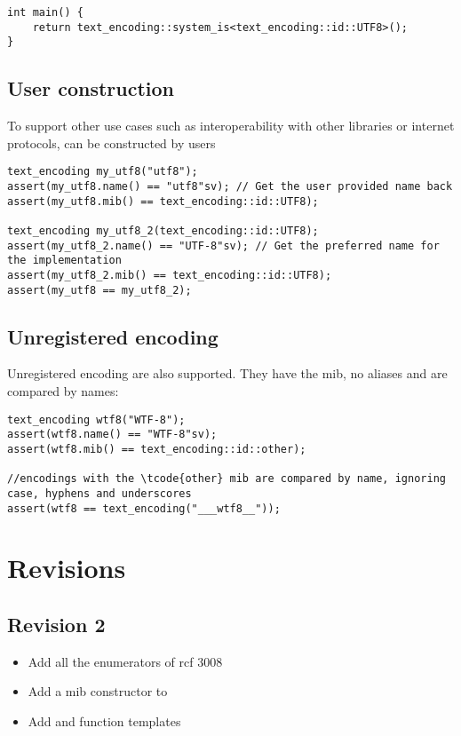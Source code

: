 \documentclass{wg21}
\begin{document}
\begin{lstlisting}[style=MY]
int main() {
    return text_encoding::system_is<text_encoding::id::UTF8>();
}
\end{lstlisting}




\subsection{User construction}

To support other use cases such as interoperability with other libraries or internet protocols,
 can be constructed by users

\begin{lstlisting}[style=MY]
text_encoding my_utf8("utf8");
assert(my_utf8.name() == "utf8"sv); // Get the user provided name back
assert(my_utf8.mib() == text_encoding::id::UTF8);

text_encoding my_utf8_2(text_encoding::id::UTF8);
assert(my_utf8_2.name() == "UTF-8"sv); // Get the preferred name for the implementation
assert(my_utf8_2.mib() == text_encoding::id::UTF8);
assert(my_utf8 == my_utf8_2);
\end{lstlisting}

\subsection{Unregistered encoding}

Unregistered encoding are also supported. They have the  mib, no aliases and are compared
by names:

\begin{lstlisting}[style=MY]
text_encoding wtf8("WTF-8");
assert(wtf8.name() == "WTF-8"sv);
assert(wtf8.mib() == text_encoding::id::other);

//encodings with the \tcode{other} mib are compared by name, ignoring case, hyphens and underscores
assert(wtf8 == text_encoding("___wtf8__"));
\end{lstlisting}


\section{Revisions}

\subsection*{Revision 2}
\begin{itemize}
	\item Add all the enumerators of rcf 3008
    \item Add a mib constructor to 
    \item Add  and  function templates
\end{itemize}
\end{document}
